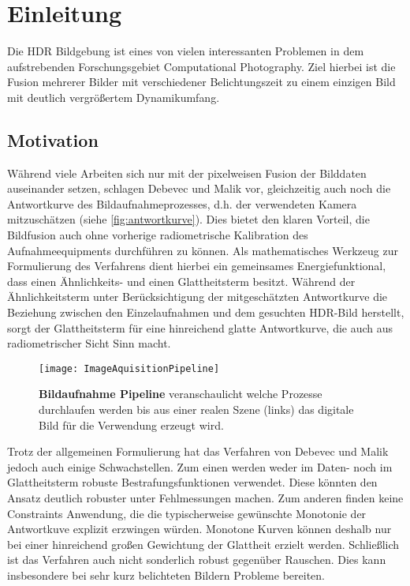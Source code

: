 \chapter{Einleitung}
Die \gls{HDR} Bildgebung ist eines von vielen interessanten Problemen in dem aufstrebenden Forschungsgebiet Computational Photography. Ziel hierbei ist die Fusion mehrerer Bilder mit verschiedener Belichtungszeit zu einem einzigen Bild mit deutlich vergrößertem Dynamikumfang.
 
\section{Motivation}


Während viele Arbeiten sich nur mit der pixelweisen Fusion der Bilddaten auseinander setzen, schlagen Debevec und Malik \cite{paper} vor, gleichzeitig auch noch die Antwortkurve des Bildaufnahmeprozesses, d.h. der verwendeten Kamera mitzuschätzen (siehe \autoref{fig:antwortkurve}). Dies bietet den klaren Vorteil, die Bildfusion auch ohne vorherige radiometrische Kalibration des Aufnahmeequipments durchführen zu können. Als mathematisches Werkzeug zur Formulierung des Verfahrens dient hierbei ein gemeinsames Energiefunktional, dass einen Ähnlichkeits- und einen  Glattheitsterm besitzt. Während der Ähnlichkeitsterm unter Berücksichtigung der mitgeschätzten Antwortkurve die Beziehung zwischen den Einzelaufnahmen und dem gesuchten HDR-Bild herstellt, sorgt der Glattheitsterm für eine hinreichend glatte Antwortkurve, die auch aus radiometrischer Sicht Sinn macht.


\begin{figure}
  \begin{center}
    \texttt{[image: ImageAquisitionPipeline]}
    \caption{\textbf{Bildaufnahme Pipeline} veranschaulicht welche Prozesse durchlaufen werden bis aus einer realen Szene (links) das digitale Bild für die Verwendung erzeugt wird. \cite[S.2]{paper}}
    \label{fig:antwortkurve}
  \end{center}
\end{figure}


Trotz der allgemeinen Formulierung hat das Verfahren von Debevec und Malik jedoch auch einige Schwachstellen. Zum einen werden weder im Daten- noch im Glattheitsterm robuste Bestrafungsfunktionen verwendet. Diese könnten den Ansatz deutlich robuster unter Fehlmessungen machen. Zum anderen finden keine Constraints Anwendung, die die typischerweise gewünschte Monotonie der Antwortkuve explizit erzwingen würden. Monotone Kurven können deshalb nur bei einer hinreichend großen Gewichtung der Glattheit erzielt werden. Schließlich ist das Verfahren auch nicht sonderlich robust gegenüber Rauschen. Dies kann insbesondere bei sehr kurz belichteten Bildern Probleme bereiten. 

